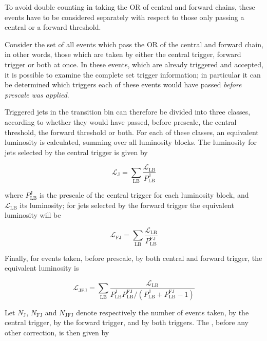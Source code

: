 To avoid double counting in taking the OR of central and forward chains, these events
have to be considered separately with respect to those only passing a central or
a forward threshold.

Consider the set of all events which pass the OR of the central and forward chain,
in other words, those which are taken by either the central trigger, forward trigger
or both at once. In these events, which are already triggered and accepted, it is
possible to examine the complete set trigger information; in particular it can be
determined which triggers each of these events would have passed \textit{before prescale was applied}.

Triggered jets in the transition bin can therefore be divided into three classes, according to
whether they would have passed, before prescale, the central threshold, the forward threshold or
both. For each of these classes, an equivalent luminosity is calculated, summing over all luminosity
blocks. The luminosity for jets selected by the central trigger is given by

\begin{equation}
  \mathcal{L}_{\mathrm{J}} = \sum_{\mathrm{LB}} \frac{\mathcal{L}_{\mathrm{LB}}}{P^{\mathrm{J}}_{\mathrm{LB}}}
\end{equation}

\noindent where $P^{\mathrm{J}}_{\mathrm{LB}}$ is the prescale of the central trigger for each luminosity
block, and $\mathcal{L}_{\mathrm{LB}}$ its luminosity; for jets selected by the forward
trigger the equivalent luminosity will be

\begin{equation}
  \mathcal{L}_{\mathrm{FJ}} = \sum_{\mathrm{LB}} \frac{\mathcal{L}_{\mathrm{LB}}}{P^{\mathrm{FJ}}_{\mathrm{LB}}}
\end{equation}

Finally, for events taken, before prescale, by both central and forward trigger, the
equivalent luminosity is

\begin{equation}
  \mathcal{L}_{\mathrm{JFJ}} = \sum_{\mathrm{LB}} \frac{\mathcal{L}_{\mathrm{LB}}}{P^{\mathrm{J}}_{\mathrm{LB}} P^{\mathrm{FJ}}_{\mathrm{LB}}/(P^{\mathrm{J}}_{\mathrm{LB}} + P^{\mathrm{FJ}}_{\mathrm{LB}}-1)}
  \label{eq:forward-inclusive:final_luminosity}
\end{equation}

Let $N_{\mathrm{J}}$, $N_{\mathrm{FJ}}$ and $N_{\mathrm{JFJ}}$ denote respectively the number of events taken,
by the central trigger, by the forward trigger, and by both triggers. The \xs, before
any other correction, is then given by

